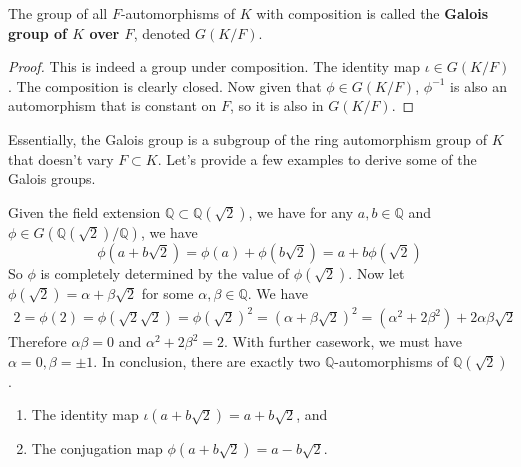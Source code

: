   \begin{definition}
    The group of all $F$-automorphisms of $K$ with composition is called the \textbf{Galois group of $K$ over $F$}, denoted $G(K/F)$. 
  \end{definition}
  \begin{proof}
    This is indeed a group under composition. The identity map $\iota \in G(K/F)$. The composition is clearly closed. Now given that $\phi \in G(K/F)$, $\phi^{-1}$ is also an automorphism that is constant on $F$, so it is also in $G(K/F)$. 
  \end{proof} 

  Essentially, the Galois group is a subgroup of the ring automorphism group of $K$ that doesn't vary $F \subset K$. Let's provide a few examples to derive some of the Galois groups. 

  \begin{example}
    Given the field extension $\mathbb{Q} \subset \mathbb{Q}(\sqrt{2})$, we have for any $a, b \in \mathbb{Q}$ and $\phi \in G(\mathbb{Q}(\sqrt{2})/\mathbb{Q})$, we have 
    \begin{equation}
      \phi(a + b \sqrt{2}) = \phi(a) + \phi(b \sqrt{2}) = a + b \phi(\sqrt{2}) 
    \end{equation}
    So $\phi$ is completely determined by the value of $\phi(\sqrt{2})$. Now let $\phi(\sqrt{2}) = \alpha + \beta \sqrt{2}$ for some $\alpha, \beta \in \mathbb{Q}$. We have 
    \begin{align}
      2 = \phi(2) = \phi(\sqrt{2} \sqrt{2}) = \phi(\sqrt{2})^2 = (\alpha + \beta\sqrt{2})^2 = (\alpha^2 + 2 \beta^2) + 2 \alpha \beta \sqrt{2} 
    \end{align}
    Therefore $\alpha \beta = 0$ and $\alpha^2 + 2 \beta^2 = 2$. With further casework, we must have $\alpha = 0, \beta = \pm 1$. In conclusion, there are exactly two $\mathbb{Q}$-automorphisms of $\mathbb{Q}(\sqrt{2})$. 
    \begin{enumerate}
      \item The identity map $\iota(a + b \sqrt{2}) = a + b \sqrt{2}$, and 
      \item The conjugation map $\phi(a + b \sqrt{2}) = a - b \sqrt{2}$. 
    \end{enumerate}
  \end{example}

